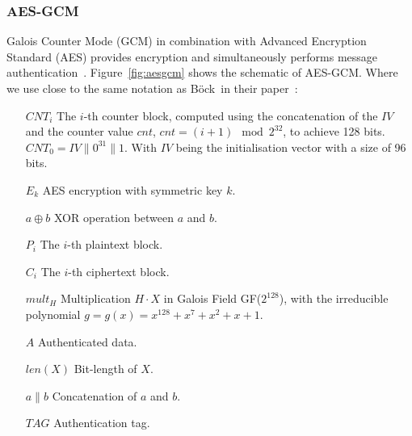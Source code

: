 \subsubsection{AES-GCM}

Galois Counter Mode (GCM) in combination with Advanced Encryption Standard (AES)
provides encryption and simultaneously performs message
authentication~\cite{gcm, gcmnist}. Figure~\ref{fig:aesgcm} shows the schematic
of AES-GCM. Where we use close to the same notation as Böck~\etal in their
paper~\cite{gcmnonceattack}:

\begin{itemize}
  \item[$CNT_i$] The $i$-th counter block, computed using the concatenation of
the $IV$ and the counter value $cnt$, $cnt = (i+1) \mod{2^{32}}$, to achieve 128
bits. $CNT_0 = IV \parallel 0 ^{31} \parallel 1$. With $IV$ being the
initialisation vector with a size of 96 bits.
  \item[$E_k$] AES encryption with symmetric key $k$.
  \item[$a \oplus b$] XOR operation between $a$ and $b$.
  \item[$P_i$] The $i$-th plaintext block.
  \item[$C_i$] The $i$-th ciphertext block.
  \item[$mult_H$] Multiplication $H \cdot X$ in Galois Field GF($2^{128}$),
with the irreducible polynomial $g = g(x) = x^{128} + x^{7} + x^{2} + x + 1$.
  \item[$A$] Authenticated data.
  \item[$len(X)$] Bit-length of $X$.
  \item[$a \parallel b$] Concatenation of $a$ and $b$.
  \item[$TAG$] Authentication tag.
\end{itemize}

